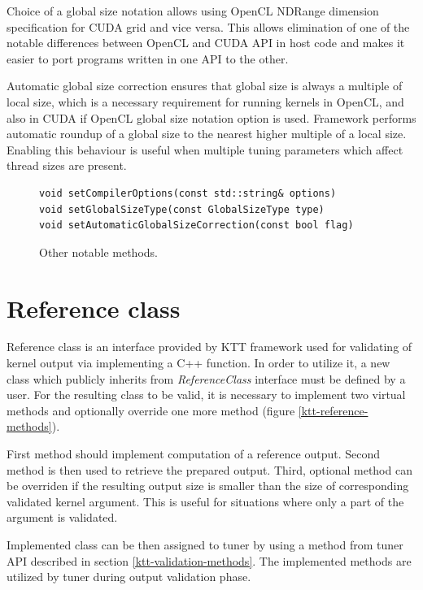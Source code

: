 \documentclass
[
    digital, %
    oneside, %
    table, %
    nolof, %
    nolot, %
    nocover %
]{fithesis3}
\begin{document}
Choice of a global size notation allows using OpenCL NDRange dimension specification for CUDA grid and vice versa. This allows elimination of one of
the notable differences between OpenCL and CUDA API in host code and makes it easier to port programs written in one API to the other.

Automatic global size correction ensures that global size is always a multiple of local size, which is a necessary requirement for running kernels
in OpenCL, and also in CUDA if OpenCL global size notation option is used. Framework performs automatic roundup of a global size to the nearest higher
multiple of a local size. Enabling this behaviour is useful when multiple tuning parameters which affect thread sizes are present.

\begin{figure}
\begin{adjustwidth}{-1cm}{-1cm}
\begin{lstlisting}
void setCompilerOptions(const std::string& options)
void setGlobalSizeType(const GlobalSizeType type)
void setAutomaticGlobalSizeCorrection(const bool flag)
\end{lstlisting}
\caption{Other notable methods.}
\label{ktt-utility-methods}
\end{adjustwidth}
\end{figure}

\section{Reference class}
\label{ktt-reference-class}
Reference class is an interface provided by KTT framework used for validating of kernel output via implementing a C++ function. In order to utilize it,
a new class which publicly inherits from \textit{ReferenceClass} interface must be defined by a user. For the resulting class to be valid, it is
necessary to implement two virtual methods and optionally override one more method (figure \ref{ktt-reference-methods}).

First method should implement computation of a reference output. Second method is then used to retrieve the prepared output. Third, optional method can
be overriden if the resulting output size is smaller than the size of corresponding validated kernel argument. This is useful for situations where only
a part of the argument is validated.

Implemented class can be then assigned to tuner by using a method from tuner API described in section \ref{ktt-validation-methods}. The implemented
methods are utilized by tuner during output validation phase.
\end{document}
